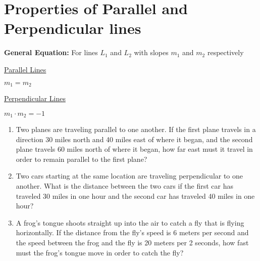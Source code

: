 \section[Linear Relationships]{Properties of Parallel and Perpendicular lines}

\textbf{General Equation:} For lines $L_1$ and $L_2$ with slopes $m_1$ and $m_2$ respectively

\begin{center}
\setlength{\columnseprule}{0pt}
\begin{multicols}{2}
\underline{Parallel Lines}

$m_1=m_2$

\columnbreak
\underline{Perpendicular Lines}

$m_1\cdot m_2=-1$
\end{multicols}
\end{center}

\vfill
\begin{enumerate}[labelindent=*,style=multiline,leftmargin=*,label=\textbf{Example \arabic*:}]
\item Two planes are traveling parallel to one another. If the first plane travels in a direction 30 miles north and 40 miles east of where it began, and the second plane travels 60 miles north of where it began, how far east must it travel in order to remain parallel to the first plane?

\vfill\item Two cars starting at the same location are traveling perpendicular to one another. What is the distance between the two cars if the first car has traveled 30 miles in one hour and the second car has traveled 40 miles in one hour?

\vfill\item A frog's tongue shoots straight up into the air to catch a fly that is flying horizontally. If the distance from the fly's speed is 6 meters per second and the speed between the frog and the fly is 20 meters per 2 seconds, how fast must the frog's tongue move in order to catch the fly?
\end{enumerate}

